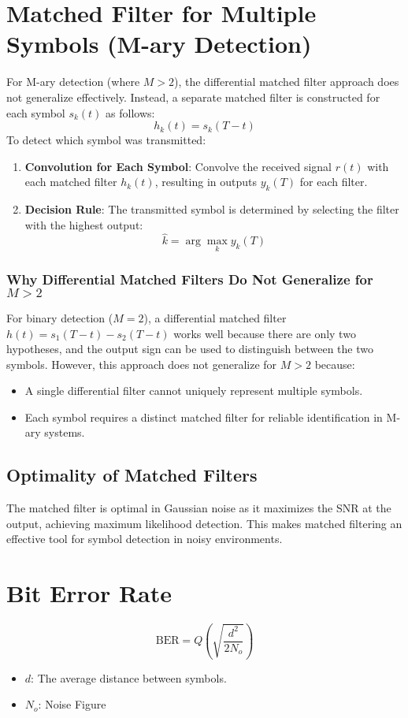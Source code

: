 \documentclass[10pt]{article}
\begin{document}
\section{Matched Filter for Multiple Symbols (M-ary Detection)}
For M-ary detection (where \( M > 2 \)), the differential matched filter approach does not generalize effectively. Instead, a separate matched filter is constructed for each symbol \( s_k(t) \) as follows:
\[
h_k(t) = s_k(T - t)
\]
To detect which symbol was transmitted:
\begin{enumerate}
    \item \textbf{Convolution for Each Symbol}: Convolve the received signal \( r(t) \) with each matched filter \( h_k(t) \), resulting in outputs \( y_k(T) \) for each filter.
    \item \textbf{Decision Rule}: The transmitted symbol is determined by selecting the filter with the highest output:
    \[
    \hat{k} = \arg \max_{k} y_k(T)
    \]
\end{enumerate}

\subsubsection{Why Differential Matched Filters Do Not Generalize for \( M > 2 \)}
For binary detection (\( M = 2 \)), a differential matched filter \( h(t) = s_1(T - t) - s_2(T - t) \) works well because there are only two hypotheses, and the output sign can be used to distinguish between the two symbols. However, this approach does not generalize for \( M > 2 \) because:
\begin{itemize}
    \item A single differential filter cannot uniquely represent multiple symbols.
    \item Each symbol requires a distinct matched filter for reliable identification in M-ary systems.
\end{itemize}

\subsection{Optimality of Matched Filters}
The matched filter is optimal in Gaussian noise as it maximizes the SNR at the output, achieving maximum likelihood detection. This makes matched filtering an effective tool for symbol detection in noisy environments.

\section{Bit Error Rate}
\[
    \text{BER} = Q\left(\sqrt{\frac{d^2}{2N_o}}\right)
\]
\begin{itemize}
    \item $d$: The average distance between symbols. 
    \item $N_o$: Noise Figure
\end{itemize}
\end{document}
